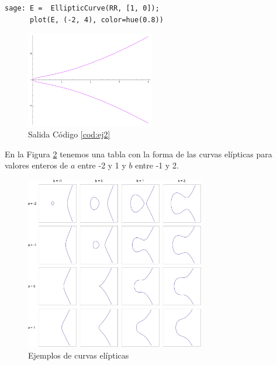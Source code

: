 \documentclass[11pt]{article}
\begin{document}
\begin{lstlisting}[label={cod:ej2}, caption={Curva elíptica $y^2=x^3+x$}, morekeywords={sage}]
sage: E =  EllipticCurve(RR, [1, 0]);
      plot(E, (-2, 4), color=hue(0.8))
\end{lstlisting}

\begin{figure}[H]
    \centering
    \includegraphics[width=0.5\textwidth]{ej2}
    \caption{Salida Código \ref{cod:ej2}}
    \label{fig:ej2}
\end{figure}

En la Figura \ref{fig:EllipticCurveCatalog} tenemos una tabla con la forma de las curvas elípticas para valores enteros de $a$ entre -2 y 1 y $b$ entre -1 y 2.

\begin{figure}[H]
    \centering
    \includegraphics[width=0.7\textwidth]{EllipticCurveCatalog}
    \caption{Ejemplos de curvas elípticas}
    \label{fig:EllipticCurveCatalog}
\end{figure}
\end{document}
